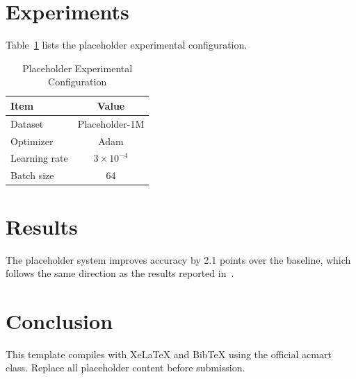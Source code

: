 \documentclass[sigconf,nonacm]{acmart}
\begin{document}
\section{Experiments}
Table~\ref{tab:setup} lists the placeholder experimental configuration.

\begin{table}[h]
  \caption{Placeholder Experimental Configuration}
  \label{tab:setup}
  \centering
  \begin{tabular}{lc}
    \toprule
    Item & Value \\
    \midrule
    Dataset      & Placeholder-1M \\
    Optimizer    & Adam           \\
    Learning rate& $3\times10^{-4}$ \\
    Batch size   & 64             \\
    \bottomrule
  \end{tabular}
\end{table}

\section{Results}
The placeholder system improves accuracy by 2.1 points over the baseline, which
follows the same direction as the results reported in~\cite{devlin2019bert}.

\section{Conclusion}
This template compiles with XeLaTeX and BibTeX using the official acmart class.
Replace all placeholder content before submission.



\end{document}
